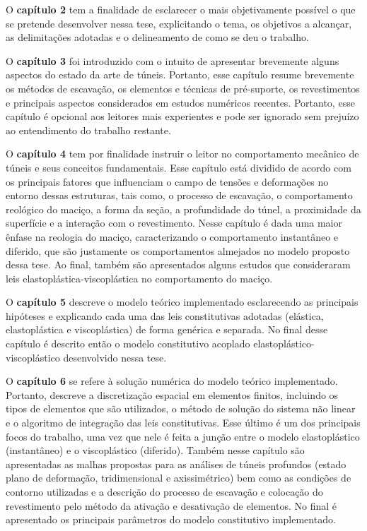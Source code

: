 O \textbf{capítulo 2} tem a finalidade de esclarecer o mais objetivamente possível o que se pretende desenvolver nessa tese, explicitando o tema, os objetivos a alcançar, as delimitações  adotadas e o delineamento de como se deu o trabalho.

O \textbf{capítulo 3} foi introduzido com o intuito de apresentar brevemente alguns aspectos do estado da arte de túneis. Portanto, esse capítulo resume brevemente os métodos de escavação, os elementos e técnicas de pré-suporte, os revestimentos e principais aspectos considerados em estudos numéricos recentes. Portanto, esse capítulo é opcional aos leitores mais experientes e pode ser ignorado sem prejuízo ao entendimento do trabalho restante.

O \textbf{capítulo 4} tem por finalidade instruir o leitor no comportamento mecânico de túneis e seus conceitos fundamentais. Esse capítulo está dividido de acordo com os principais fatores que influenciam o campo de tensões e deformações no entorno dessas estruturas, tais como, o processo de escavação, o comportamento reológico do maciço, a forma da seção, a profundidade do túnel, a proximidade da superfície e a interação com o revestimento. Nesse capítulo é dada uma maior ênfase na reologia do maciço, caracterizando o comportamento instantâneo e diferido, que são justamente os comportamentos almejados no modelo proposto dessa tese. Ao final, também são apresentados alguns estudos que consideraram leis elastoplástica-viscoplástica no comportamento do maciço.

O \textbf{capítulo 5} descreve o modelo teórico implementado esclarecendo as principais hipóteses e explicando cada uma das leis constitutivas adotadas (elástica, elastoplástica e viscoplástica) de forma genérica e separada. No final desse capítulo é descrito então o modelo constitutivo acoplado elastoplástico-viscoplástico desenvolvido nessa tese.

O \textbf{capítulo 6} se refere à solução numérica do modelo teórico implementado. Portanto, descreve a discretização espacial em elementos finitos, incluindo os tipos de elementos que são utilizados, o método de solução do sistema não linear e o algoritmo de integração das leis constitutivas. Esse último é um dos principais focos do trabalho, uma vez que nele é feita a junção entre o modelo elastoplástico (instantâneo) e o viscoplástico (diferido). Também nesse capítulo são apresentadas as malhas propostas para as análises de túneis profundos (estado plano de deformação, tridimensional e axissimétrico) bem como as condições de contorno utilizadas e a descrição do processo de escavação e colocação do revestimento pelo método da ativação e desativação de elementos. No final é apresentado os principais parâmetros do modelo constitutivo implementado.

